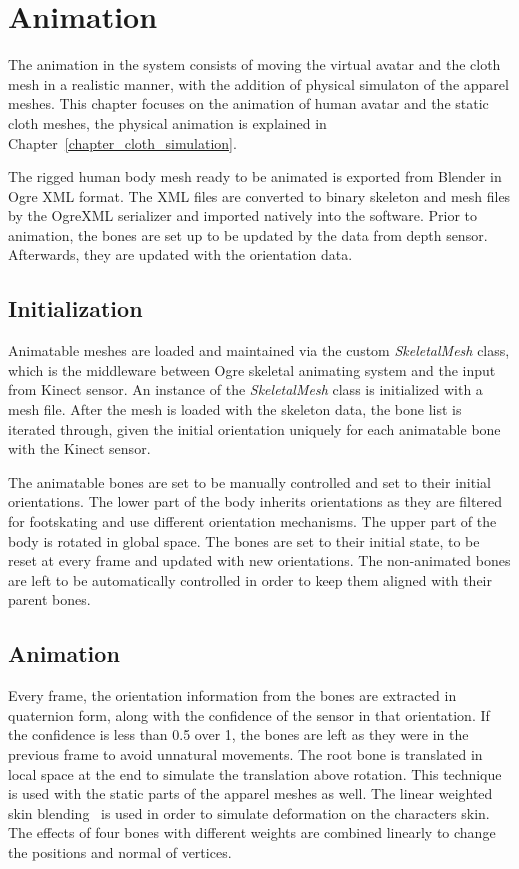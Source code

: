 \chapter{Animation}
\label{chapter_animation}

The animation in the system consists of moving the virtual avatar and the cloth mesh in a realistic manner, with the addition of physical simulaton of the apparel meshes. This chapter focuses on the animation of human avatar and the static cloth meshes, the physical animation is explained in Chapter~\ref{chapter_cloth_simulation}.

The rigged human body mesh ready to be animated is exported from Blender in Ogre XML format. The XML files are converted to binary skeleton and mesh files by the OgreXML serializer and imported natively into the software. Prior to animation, the bones are set up to be updated by the data from depth sensor. Afterwards, they are updated with the orientation data.

\section{Initialization}
\label{section_animation_initialization}

Animatable meshes are loaded and maintained via the custom {\em SkeletalMesh} class, which is the middleware between Ogre skeletal animating system and the input from Kinect sensor. An instance of the {\em SkeletalMesh} class is initialized with a mesh file. After the mesh is loaded with the skeleton data, the bone list is iterated through, given the initial orientation uniquely for each animatable bone with the Kinect sensor. 

The animatable bones are set to be manually controlled and set to their initial orientations. The lower part of the body inherits orientations as they are filtered for footskating and use different orientation mechanisms. The upper part of the body is rotated in global space. The bones are set to their initial state, to be reset at every frame and updated with new orientations. The non-animated bones are left to be automatically controlled in order to keep them aligned with their parent bones. 

\section{Animation}
\label{section_animation}
Every frame, the orientation information from the bones are extracted in quaternion form, along with the confidence of the sensor in that orientation. If the confidence is less than 0.5 over 1, the bones are left as they were in the previous frame to avoid unnatural movements. The root bone is translated in local space at the end to simulate the translation above rotation. This technique is used with the static parts of the apparel meshes as well. The linear weighted skin blending~\cite{Kavan2003} is used in order to simulate deformation on the characters skin. The effects of four bones with different weights are combined linearly to change the positions and normal of vertices. 

